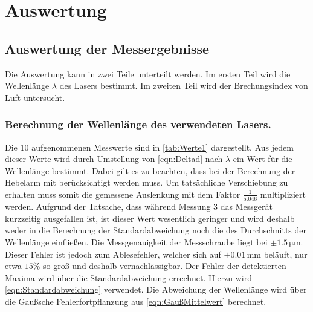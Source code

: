 \section{Auswertung}
\label{sec:Auswertung}


\subsection{Auswertung der Messergebnisse}

Die Auswertung kann in zwei Teile unterteilt werden. Im ersten Teil wird die Wellenlänge $\lambda$ des Lasers bestimmt. Im zweiten Teil wird
der Brechungsindex von Luft untersucht.

\subsubsection{Berechnung der Wellenlänge des verwendeten Lasers.}
\label{sec:Wellenlänge}
Die 10 aufgenommenen Messwerte sind in \autoref{tab:Werte1} dargestellt. Aus jedem dieser Werte wird durch Umstellung von \autoref{eqn:Deltad} nach $\lambda$ ein Wert für die Wellenlänge bestimmt. 
Dabei gilt es zu beachten, dass bei der Berechnung der Hebelarm mit berücksichtigt werden muss. Um tatsächliche Verschiebung zu erhalten muss somit die gemessene Auslenkung mit dem Faktor $\frac{1}{5.046}$ multipliziert werden.%
Aufgrund der Tatsache, dass während Messung 3 das Messgerät kurzzeitig ausgefallen ist, ist dieser Wert wesentlich geringer und wird deshalb weder in die Berechnung der Standardabweichung noch die des Durchschnitts der Wellenlänge einfließen.
Die Messgenauigkeit der Messschraube liegt bei $\pm 1.5\, \unit{\micro \meter}$\cite{Messgenauigkeit}. Dieser Fehler ist jedoch zum Ablesefehler, welcher sich auf $\pm 0.01\, \unit{\milli \meter}$ beläuft, nur etwa $15 \%$ so groß und deshalb vernachlässigbar.
Der Fehler der detektierten Maxima wird über die Standardabweichung errechnet. Hierzu wird \autoref{eqn:Standardabweichung} verwendet. Die Abweichung der Wellenlänge wird über die Gaußsche Fehlerfortpflanzung aus \autoref{eqn:GaußMittelwert} berechnet. 

